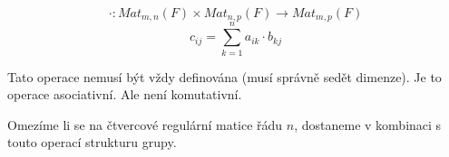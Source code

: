 \begin{definition}
    $$\cdot: Mat_{m,n}(F) \times Mat_{n,p}(F) \rightarrow Mat_{m,p}(F)$$
    $$c_{ij} = \sum_{k=1}^n a_{ik} \cdot b_{kj}$$

    Tato operace nemusí být vždy definována (musí správně sedět dimenze).
    Je to operace asociativní. Ale není komutativní.

    Omezíme li se na čtvercové regulární matice řádu $n$, dostaneme v kombinaci s touto operací
    strukturu grupy.
\end{definition}

